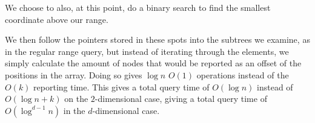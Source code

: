 \documentclass[11pt,a4paper]{article}
\begin{document}
We choose to also, at this point, do a binary search to find the smallest
coordinate above our range.

We then follow the pointers stored in these spots into the subtrees we
examine, as in the regular range query, but instead of iterating through the
elements, we simply calculate the amount of nodes that would be reported as an
offset of the positions in the array. Doing so gives $\log n$ $O(1)$ operations
instead of the $O(k)$ reporting time. This gives a total query time of $O(\log n)$
instead of $O(\log n + k)$ on the $2$-dimensional case, giving a total query time
of $O(\log^{d-1}n)$ in the $d$-dimensional case.
\end{document}
